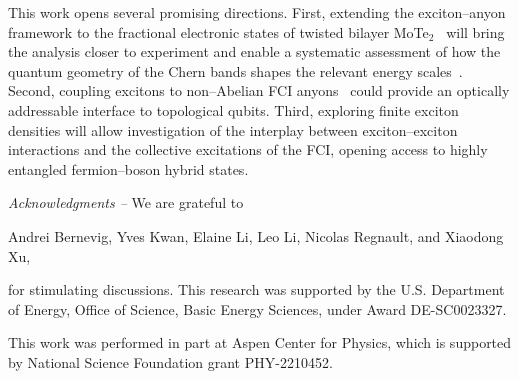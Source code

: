 \documentclass[aps,prl,twocolumn,amsmath,amssymb,nofootinbib,superscriptaddress,floatfix]{revtex4-1}
\begin{document}
{
This work opens several promising directions. First, extending the exciton--anyon framework to the fractional electronic states of twisted bilayer MoTe$_2$~\cite{lu-santos-2024fractional,lu2025electromagnetic,wang2024fractional,wang2023topology,jia2024moire,Xu2025multiple,wang2025higher,pichler2025single,liu2025characterization,yan2025anyon} will bring the analysis closer to experiment and enable a systematic assessment of how the quantum geometry of the Chern bands shapes the relevant energy scales~\cite{wang2021exact,ledwith2023vortexability,onishi2025quantum,yu2025quantum}. Second, coupling excitons to non--Abelian FCI anyons~\cite{reddy2024non,Ahn2024non-abelian,chen2025robust,liu2025non} could provide an optically addressable interface to topological qubits. Third, exploring finite exciton densities will allow investigation of the interplay between exciton--exciton interactions and the collective excitations of the FCI, opening access to highly entangled fermion--boson hybrid states.
}



\vspace{0.5cm}

\noindent
\textit{Acknowledgments --} We are grateful to

Andrei Bernevig,
Yves Kwan,
Elaine Li,
Leo Li,
Nicolas Regnault,
and
Xiaodong Xu,

for stimulating discussions. This research was supported by the U.S. Department of Energy, Office of Science, Basic Energy Sciences, under Award DE-SC0023327.

This work was performed in part at Aspen Center for Physics, which is supported by National Science Foundation grant PHY-2210452.


\end{document}
